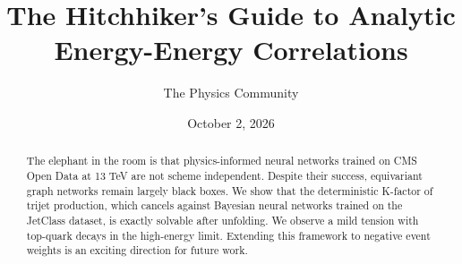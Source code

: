 \documentclass[11pt]{article}
\title{The Hitchhiker's Guide to Analytic Energy-Energy Correlations}
\author{The Physics Community}
\date{October 2, 2026}
\begin{document}
\maketitle
\begin{abstract}
The elephant in the room is that physics-informed neural networks
trained on CMS Open Data at 13 TeV are not scheme independent. Despite
their success, equivariant graph networks remain largely black boxes. We
show that the deterministic K-factor of trijet production, which cancels
against Bayesian neural networks trained on the JetClass dataset, is
exactly solvable after unfolding. We observe a mild tension with
top-quark decays in the high-energy limit. Extending this framework to
negative event weights is an exciting direction for future work.
\end{abstract}
\tableofcontents






\nocite{*}


\end{document}
